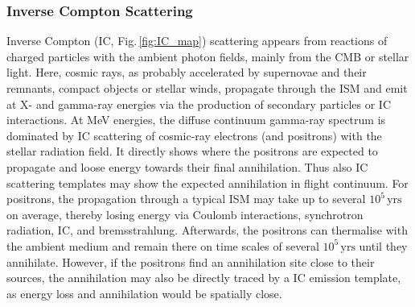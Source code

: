 \documentclass[doublespace,nopageskip]{VTthesis}
\newcommand{\mrm}[1]{\mathrm{#1}}
\begin{document}
\subsubsection{Inverse Compton Scattering}

Inverse Compton ({IC}, Fig.\,\ref{fig:IC_map}) scattering appears from reactions of charged particles with the ambient photon fields, mainly from the CMB or stellar light.
%
Here, cosmic rays, as probably accelerated by supernovae and their remnants, compact objects or stellar winds, propagate through the ISM and emit at X- and gamma-ray energies via the production of secondary particles or {IC} interactions.
%
At MeV energies, the diffuse continuum gamma-ray spectrum is dominated by {IC} scattering of cosmic-ray electrons (and positrons) with the stellar radiation field.
%
It directly shows where the positrons are expected to propagate and loose energy towards their final annihilation.
%
Thus also {IC} scattering templates may show the expected annihilation in flight continuum.
%
For positrons, the propagation through a typical ISM may take up to several $10^5\,\mrm{yrs}$ on average, thereby losing energy via Coulomb interactions, synchrotron radiation, {IC}, and bremsstrahlung.
%
Afterwards, the positrons can thermalise with the ambient medium and remain there on time scales of several $10^{5}\,\mrm{yrs}$ until they annihilate.
%
However, if the positrons find an annihilation site close to their sources, the annihilation may also be directly traced by a {IC} emission template, as energy loss and annihilation would be spatially close.

\end{document}
